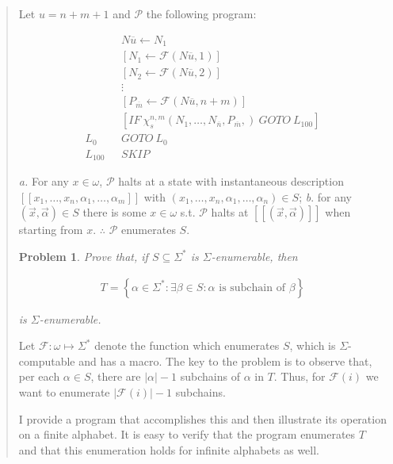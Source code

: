 \documentclass[a4paper, 12pt]{article}
\newtheorem{problem}{Problem}
\newtheorem{problem}{Problem}
\begin{document}
\begin{quote}
Let $u = n + m + 1$ and $\mathcal{P}$ the following program:

\begin{align*}
    &N \overline{u} \leftarrow N_1\\
    &[N_1 \leftarrow \mathcal{F}(N \overline{u}, 1)] \\
    &[N_2 \leftarrow \mathcal{F}(N \overline{u}, 2)] \\ 
    &\vdots \\
    &[P_{\overline{m}} \leftarrow \mathcal{F}(N \overline{u}, n+m)] \\
    &[IF ~ \chi_s^{n, m} \left( N_1, \ldots, N_{\overline{n}}, P_{\overline{m}},
    \right) ~ GOTO ~ L_{100}] \\
    L_{0} ~ ~ ~ & GOTO ~ L_0 \\ 
    L_{100} ~ ~ ~ & SKIP
\end{align*}

\textit{a.} For any $x \in \omega$, $\mathcal{P}$ halts at a state with
instantaneous description $[\![ x_1, \ldots, x_n, \alpha_1, \ldots, \alpha_m
]\!]$ with $(x_1, \ldots, x_n, \alpha_1, \ldots, \alpha_n) \in S$; \textit{b}.
for any $(\vec{x}, \vec{\alpha}) \in S$ there is some $x \in \omega$ s.t.
$\mathcal{P}$ halts at $[\![ (\vec{x}, \vec{\alpha})  ]\!]$ when starting from
$x$. $\therefore $ $\mathcal{P}$ enumerates $S$.

\begin{problem}
    Prove that, if $S \subseteq \Sigma^{*}$ is $\Sigma$-enumerable, then 

    \begin{align*}
        T = \left\{ \alpha \in \Sigma^{*}: \exists \beta \in S :  \alpha
        \text{ is subchain of } \beta\right\} 
    \end{align*}

    is $\Sigma$-enumerable. 

\end{problem}

Let $\mathcal{F} : \omega \mapsto \Sigma^{*}$ denote the function which
enumerates $S$, which is $\Sigma$-computable and has a macro. The key to the
problem is to observe that, per each $\alpha \in S$, there are $|\alpha| - 1$
subchains of $\alpha$ in $T$. Thus, for $\mathcal{F}(i)$ we want to enumerate
 $|\mathcal{F}(i)| - 1$ subchains. 

 I provide a program that accomplishes this and then illustrate its operation on
 a finite alphabet. It is easy to verify that the program enumerates $T$ and
 that this enumeration holds for infinite alphabets as well.


\end{quote}
\end{document}
